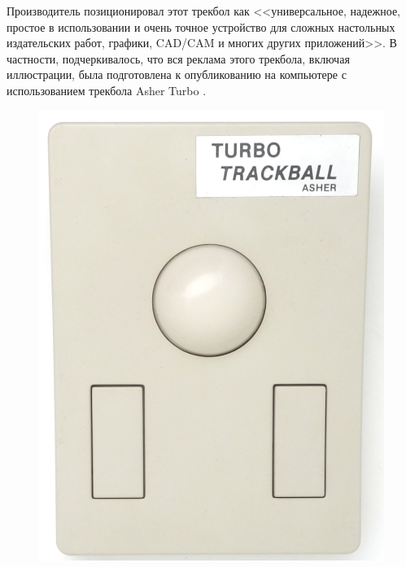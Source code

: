 \documentclass[11pt, a4paper]{article}
\begin{document}
Производитель позиционировал этот трекбол как <<универсальное, надежное, простое в использовании и очень точное устройство для сложных настольных издательских работ, графики, CAD/CAM и многих других приложений>>. В частности, подчеркивалось, что вся реклама этого трекбола, включая иллюстрации, была подготовлена к опубликованию на компьютере с использованием трекбола Asher Turbo \cite{turbo}.

\begin{figure}[h]
    \centering
    \includegraphics[scale=0.6]{1988_asher_turbo_trackball/top_15.jpg}

\end{figure}
\end{document}
